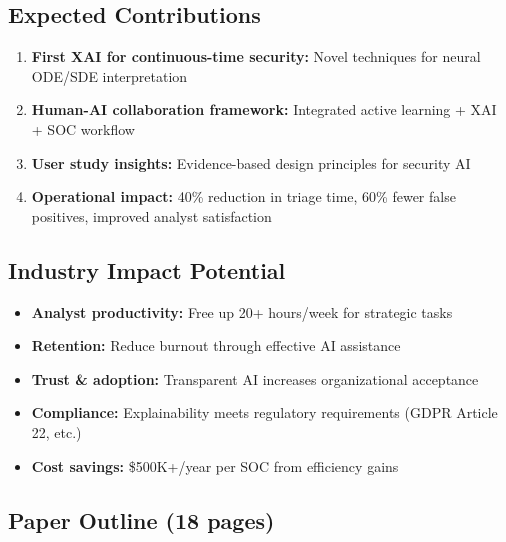 \documentclass[11pt,letterpaper]{article}
\begin{document}
\subsection{Expected Contributions}

\begin{enumerate}
\item \textbf{First XAI for continuous-time security:} Novel techniques for neural ODE/SDE interpretation
\item \textbf{Human-AI collaboration framework:} Integrated active learning + XAI + SOC workflow
\item \textbf{User study insights:} Evidence-based design principles for security AI
\item \textbf{Operational impact:} 40\% reduction in triage time, 60\% fewer false positives, improved analyst satisfaction
\end{enumerate}

\subsection{Industry Impact Potential}

\begin{itemize}
\item \textbf{Analyst productivity:} Free up 20+ hours/week for strategic tasks
\item \textbf{Retention:} Reduce burnout through effective AI assistance
\item \textbf{Trust \& adoption:} Transparent AI increases organizational acceptance
\item \textbf{Compliance:} Explainability meets regulatory requirements (GDPR Article 22, etc.)
\item \textbf{Cost savings:} \$500K+/year per SOC from efficiency gains
\end{itemize}

\subsection{Paper Outline (18 pages)}
\end{document}
